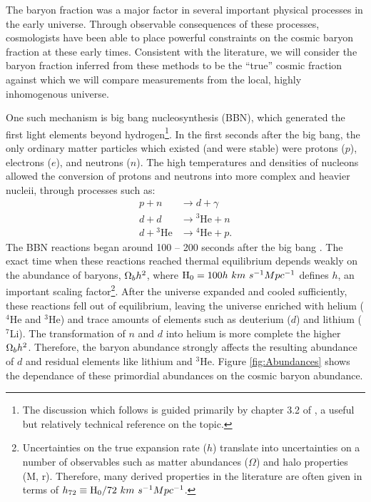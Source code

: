 The baryon fraction was a major factor in several important physical
processes in the early universe. Through observable consequences of
these processes, cosmologists have been able to place powerful
constraints on the cosmic baryon fraction at these early
times. Consistent with the literature, we will consider the baryon
fraction inferred from these methods to be the ``true'' cosmic
fraction against which we will compare measurements from the local,
highly inhomogenous universe.

One such mechanism is big bang nucleosynthesis (BBN), which generated
the first light elements beyond hydrogen\footnote{The discussion which
  follows is guided primarily by chapter 3.2 of \citet{Weinberg2008},
  a useful but relatively technical reference on the topic.}. In the
first seconds after the big bang, the only ordinary matter particles
which existed (and were stable) were protons ($p$), electrons
($e$), and neutrons ($n$). The high temperatures and densities of
nucleons allowed the conversion of protons and neutrons into more
complex and heavier nucleii, through processes such as:
\begin{align}
p + n &\rightarrow{} d + \gamma \nonumber \\
d + d &\rightarrow{} ^3\textrm{He} + n \nonumber \\
d +{} ^3\textrm{He} &\rightarrow{} ^4\textrm{He} + p .\nonumber
\end{align}
The BBN reactions began around 100 -- 200 seconds after the big bang
\citep{Weinberg2008}. The exact time when these reactions reached
thermal equilibrium depends weakly on the abundance of baryons,
$\Omega_b h^2$, where $\textrm{H\ensuremath{_0}} = 100h~km~s^{-1} Mpc^{-1}$ defines $h$, an
important scaling factor\footnote{Uncertainties on the true expansion
  rate ($h$) translate into uncertainties on a number of observables
  such as matter abundances ($\Omega$) and halo properties (M,
  r). Therefore, many derived properties in the literature are often
  given in terms of $h_{72} \equiv{} \textrm{H\ensuremath{_0}} / 72~km~s^{-1} Mpc^{-1}$.}. After the universe expanded and cooled sufficiently, these
reactions fell out of equilibrium, leaving the universe enriched with
helium ($^4$He and $^3$He) and trace amounts of elements such as
deuterium ($d$) and lithium ($^7$Li). The transformation of $n$ and
$d$ into helium is more complete the higher $\Omega_b h^2$. Therefore,
the baryon abundance strongly affects the resulting abundance of $d$
and residual elements like lithium and $^3$He. Figure
\ref{fig:Abundances} shows the dependance of these primordial
abundances on the cosmic baryon abundance.


